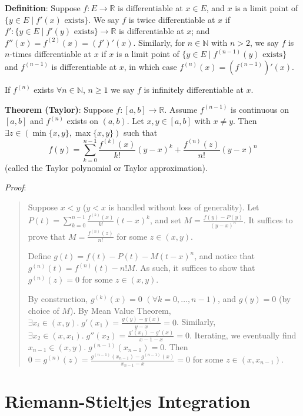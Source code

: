 \documentclass[11pt]{article}
\begin{document}
\textbf{Definition}: Suppose $f : E \to \mathbb{R}$ is differentiable at $x \in E$, and $x$ is a limit point of $\{y \in E \;|\; f'(x) \text{ exists}\}$. We say $f$ is twice differentiable at $x$ if $f' : \{y \in E \;|\; f'(y) \text{ exists}\} \to \mathbb{R}$ is differentiable at $x$; and $f''(x) = f^{(2)}(x) = (f')'(x)$. Similarly, for $n \in \mathbb{N}$ with $n > 2$, we say $f$ is $n$-times differentiable at $x$ if $x$ is a limit point of $\{y \in E \;|\; f^{(n-1)}(y) \text{ exists}\}$ and $f^{(n-1)}$ is differentiable at $x$, in which case $f^{(n)}(x) = (f^{(n-1)})'(x)$.

If $f^{(n)}$ exists $\forall n \in \mathbb{N}$, $n \geq 1$ we say $f$ is infinitely differentiable at $x$.

\textbf{Theorem (Taylor)}: Suppose $f : [a,b] \to \mathbb{R}$. Assume $f^{(n-1)}$ is continuous on $[a,b]$ and $f^(n)$ exists on $(a,b)$. Let $x,y \in [a,b]$ with $x \neq y$. Then $\exists z \in (\min\{x,y\}, \max\{x,y\})$ such that
\begin{displaymath}
f(y) = \sum_{k=0}^{n-1} \frac{f^{(k)}(x)}{k!} (y-x)^k + \frac{f^{(n)}(z)}{n!} (y-x)^n
\end{displaymath}
(called the Taylor polynomial or Taylor approximation).

\emph{Proof}:
\begin{quote}\vspace{-0.3cm}
Suppose $x < y$ ($y < x$ is handled without loss of generality). Let $P(t) = \sum_{k=0}^{n-1} \frac{f^{(k)}(x)}{k!} (t-x)^k$, and set $M = \frac{f(y) - P(y)}{(y-x)^n}$. It suffices to prove that $M = \frac{f^{(n)}(z)}{n!}$ for some $z \in (x,y)$.

Define $g(t) = f(t) - P(t) - M(t-x)^n$, and notice that $g^{(n)}(t) = f^{(n)}(t) - n!M$. As such, it suffices to show that $g^{(n)}(z) = 0$ for some $z \in (x,y)$.

By construction, $g^{(k)}(x) = 0$ $(\forall k = 0, \ldots, n-1)$, and $g(y) = 0$ (by choice of $M$). By Mean Value Theorem, $\exists x_i \in (x,y).\; g'(x_1) = \frac{g(y) - g(x)}{y-x} = 0$. Similarly, $\exists x_2 \in (x, x_1).\; g''(x_2) = \frac{g'(x_1) - g'(x)}{x-1 - x} = 0$. Iterating, we eventually find $x_{n-1} \in (x,y).\; g^{(n-1)}(x_{n-1}) = 0$. Then $0 = g^{(n)}(z) = \frac{g^{(n-1)}(x_{n-1}) - g^{(n-1)}(x)}{x_{n-1} - x} = 0$ for some $z \in (x, x_{n-1})$.
\end{quote}

\section{Riemann-Stieltjes Integration}
\end{document}
